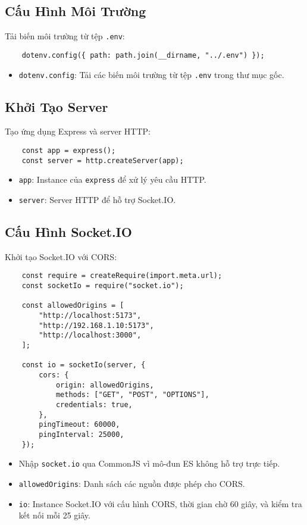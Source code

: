         \subsection{Cấu Hình Môi Trường}
            \hspace*{0.6cm}Tải biến môi trường từ tệp \texttt{.env}:
            \begin{lstlisting}
    dotenv.config({ path: path.join(__dirname, "../.env") });
            \end{lstlisting}
            \begin{itemize}
                \item \texttt{dotenv.config}: Tải các biến môi trường từ tệp \texttt{.env} trong thư mục gốc.
            \end{itemize}

        \subsection{Khởi Tạo Server}
            \hspace*{0.6cm}Tạo ứng dụng Express và server HTTP:
            \begin{lstlisting}
    const app = express();
    const server = http.createServer(app);
            \end{lstlisting}
            \begin{itemize}
                \item \texttt{app}: Instance của \texttt{express} để xử lý yêu cầu HTTP.
                \item \texttt{server}: Server HTTP để hỗ trợ Socket.IO.
            \end{itemize}

        \subsection{Cấu Hình Socket.IO}
            \hspace*{0.6cm}Khởi tạo Socket.IO với CORS:
            \begin{lstlisting}
    const require = createRequire(import.meta.url);
    const socketIo = require("socket.io");

    const allowedOrigins = [
        "http://localhost:5173",
        "http://192.168.1.10:5173",
        "http://localhost:3000",
    ];

    const io = socketIo(server, {
        cors: {
            origin: allowedOrigins,
            methods: ["GET", "POST", "OPTIONS"],
            credentials: true,
        },
        pingTimeout: 60000,
        pingInterval: 25000,
    });
            \end{lstlisting}
            \begin{itemize}
                \item Nhập \texttt{socket.io} qua CommonJS vì mô-đun ES không hỗ trợ trực tiếp.
                \item \texttt{allowedOrigins}: Danh sách các nguồn được phép cho CORS.
                \item \texttt{io}: Instance Socket.IO với cấu hình CORS, thời gian chờ 60 giây, và kiểm tra kết nối mỗi 25 giây.
            \end{itemize}


